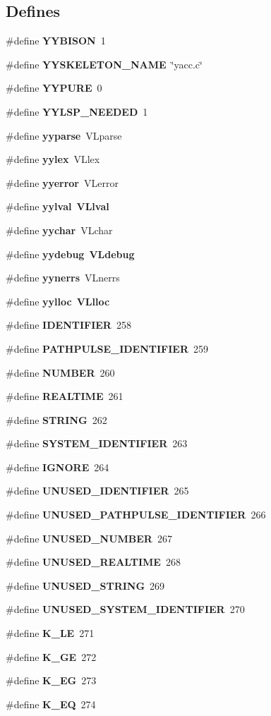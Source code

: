 \subsection*{Defines}
\begin{CompactItemize}
\item 
\#define {\bf YYBISON}\ 1
\item 
\#define {\bf YYSKELETON\_\-NAME}\ \char`\"{}yacc.c\char`\"{}
\item 
\#define {\bf YYPURE}\ 0
\item 
\#define {\bf YYLSP\_\-NEEDED}\ 1
\item 
\#define {\bf yyparse}\ VLparse
\item 
\#define {\bf yylex}\ VLlex
\item 
\#define {\bf yyerror}\ VLerror
\item 
\#define {\bf yylval}\ {\bf VLlval}
\item 
\#define {\bf yychar}\ VLchar
\item 
\#define {\bf yydebug}\ {\bf VLdebug}
\item 
\#define {\bf yynerrs}\ VLnerrs
\item 
\#define {\bf yylloc}\ {\bf VLlloc}
\item 
\#define {\bf IDENTIFIER}\ 258
\item 
\#define {\bf PATHPULSE\_\-IDENTIFIER}\ 259
\item 
\#define {\bf NUMBER}\ 260
\item 
\#define {\bf REALTIME}\ 261
\item 
\#define {\bf STRING}\ 262
\item 
\#define {\bf SYSTEM\_\-IDENTIFIER}\ 263
\item 
\#define {\bf IGNORE}\ 264
\item 
\#define {\bf UNUSED\_\-IDENTIFIER}\ 265
\item 
\#define {\bf UNUSED\_\-PATHPULSE\_\-IDENTIFIER}\ 266
\item 
\#define {\bf UNUSED\_\-NUMBER}\ 267
\item 
\#define {\bf UNUSED\_\-REALTIME}\ 268
\item 
\#define {\bf UNUSED\_\-STRING}\ 269
\item 
\#define {\bf UNUSED\_\-SYSTEM\_\-IDENTIFIER}\ 270
\item 
\#define {\bf K\_\-LE}\ 271
\item 
\#define {\bf K\_\-GE}\ 272
\item 
\#define {\bf K\_\-EG}\ 273
\item 
\#define {\bf K\_\-EQ}\ 274

\end{CompactItemize}
